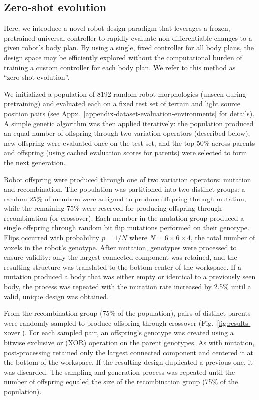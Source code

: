 \subsection{Zero-shot evolution}
\label{methods-zero-shot-evolution}

Here, we introduce a novel robot design paradigm that leverages a frozen, pretrained universal controller to rapidly evaluate non-differentiable changes to a given robot's body plan. 
By using a single, fixed controller for all body plans,
the design space may be efficiently explored without the computational burden of training a custom controller for each body plan. 
We refer to this method as ``zero-shot evolution''. 

We initialized a population of 8192 random robot morphologies (unseen during pretraining) and evaluated each on a fixed test set of terrain and light source position pairs (see Appx.~\ref{appendix-dataset-evaluation-environments} for details). A simple genetic algorithm was then applied iteratively: the population produced an equal number of offspring through two variation operators (described below), new offspring were evaluated once on the test set, and the top 50\% across parents and offspring (using cached evaluation scores for parents) were selected to form the next generation.

Robot offspring were produced through one of two variation operators: mutation and recombination. The population was partitioned into two distinct groups: a random 25\% of members were assigned to produce offspring through mutation, while the remaining 75\% were reserved for producing offspring through recombination (or crossover). Each member in the mutation group produced a single offspring through random bit flip mutations performed on their genotype. Flips occurred with probability $p = 1/N$ where $N = 6 \times 6 \times 4$, the total number of voxels in the robot's genotype. After mutation, genotypes were processed to ensure validity: only the largest connected component was retained, and the resulting structure was translated to the bottom center of the workspace. If a mutation produced a body that was either empty or identical to a previously seen body, the process was repeated with the mutation rate increased by 2.5\% until a valid, unique design was obtained.

From the recombination group (75\% of the population), pairs of distinct parents were randomly sampled to produce offspring through crossover (Fig.~\ref{fig:results-xover}). 
For each sampled pair, an offspring's genotype was created using a bitwise exclusive or (XOR) operation on the parent genotypes. As with mutation, post-processing retained only the largest connected component and centered it at the bottom of the workspace. If the resulting design duplicated a previous one, it was discarded. The sampling and generation process was repeated until the number of offspring equaled the size of the recombination group (75\% of the population).


